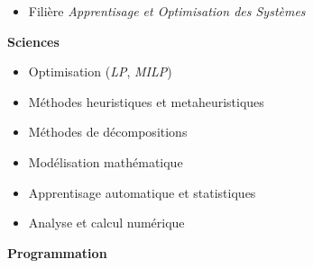\documentclass[11.5pt]{article}
\newcommand\en[1]{}
\newcommand\fr[1]{#1}
\begin{document}
\begin{minipage}[t]{\textwidth}
\begin{minipage}[t]{\cvRightWidth}
{                \begin{itemize}
                    \fr{
                        \item Filière \textit{Apprentisage et Optimisation des Systèmes}
                    }
                    \en{
                        \item Major : \textit{Optimization and learning of systems}
                    }
                \end{itemize}
            }
            \cvSection{\fr{Compétences}\en{Skills}}
            \textbf{Sciences}
                \vspace{10pt}
                \begin{itemize}
                    \fr{
                        \item Optimisation {\small (\emph{LP}, \emph{MILP})}
                        \item Méthodes heuristiques et metaheuristiques
                        \item Méthodes de décompositions
                        \item Modélisation mathématique
                        \item Apprentisage automatique et statistiques
                        \item Analyse et calcul numérique
                    }
                    \en{
                        \item Linear and non linear optimization {\small (\emph{LP}, \emph{MILP}, \emph{KKT})}
                        \item Optimization under uncertainty (robust, stochastic)
                        \item Decomposition methods (Dantzig-Wolfe, Benders)
                        \item Heuristics and metaheuristic methods
                        \item Mathematical modeling
                        \item Exact approaches
                        \item Machine learning and statistics
                        \item Numerical analysis
                    }
                \end{itemize}
                \vspace{10pt}
            \textbf{Programmation}
            \begin{multicols}{2}
                \begin{itemize}

\end{itemize}
\end{multicols}
\end{minipage}
\end{minipage}
\end{document}
